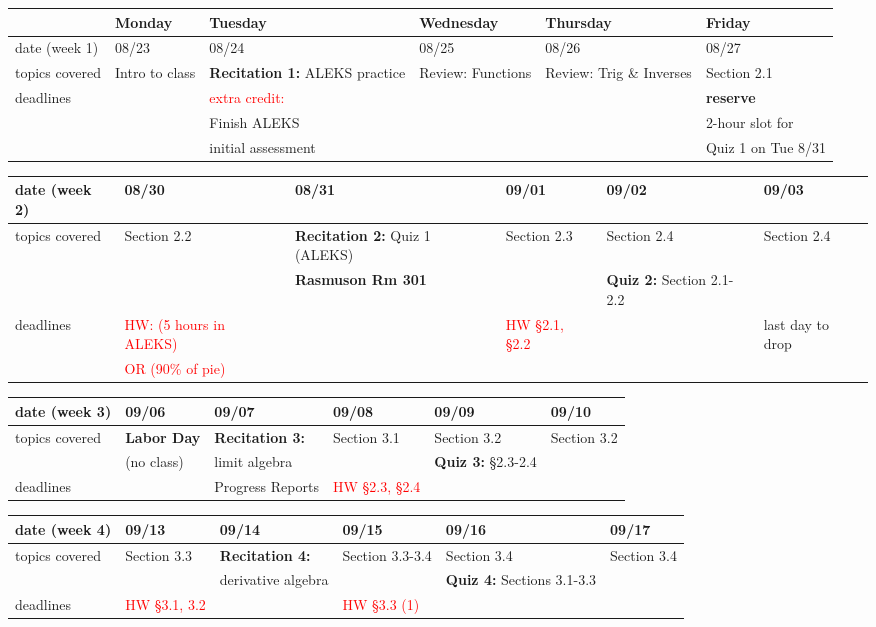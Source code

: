 \documentclass[11pt,fleqn]{article}
\begin{document}
\begin{tabularx}{\textwidth}{|X|| X | X | X | X | X |}
\hline
&Monday & Tuesday & Wednesday & Thursday & Friday \\
\hline \hline
\rowcolor{gray!20} 
date (week 1)&08/23&08/24&08/25&08/26&08/27\\
\hline
topics covered&Intro to class& \textbf{Recitation 1:} ALEKS practice&  Review: Functions & Review:  Trig \& Inverses&Section 2.1\\
\hline
deadlines&&\textcolor{red}{extra credit:} &&&\textbf{reserve}\\
&&Finish ALEKS&&&2-hour slot for\\
&& initial assessment &&& Quiz 1 on Tue 8/31\\
\hline 
\end{tabularx}
\vfill
\begin{tabularx}{\textwidth}{|X|| X | X | X | X | X |}
\hline
\rowcolor{gray!20}
date (week 2)&08/30&08/31&09/01&09/02&09/03\\ \hline
topics covered &Section 2.2&\textbf{Recitation 2:} Quiz 1 (ALEKS)& Section 2.3 &Section 2.4&Section 2.4\\ 
&&\textbf{\textcolor{ddgreen}{Rasmuson Rm 301}}&&\textbf{Quiz 2:} Section 2.1-2.2&\\ \hline
deadlines&\textcolor{red}{HW: (5 hours in ALEKS)}&&\textcolor{red}{HW \S 2.1, \S 2.2}&&\textcolor{ddgreen}{last day to drop}\\ 
& \textcolor{red}{ OR (90\% of pie)}&&&& \\
 \hline 
 \end{tabularx}
 \vfill
\begin{tabularx}{\textwidth}{|X|| X | X | X | X | X |}
\hline
\rowcolor{gray!20}
date (week 3)&09/06&09/07&09/08&09/09&09/10\\ \hline
topics covered&\textbf{Labor Day}&\textbf{Recitation 3:} &Section 3.1 &Section 3.2&Section 3.2\\
&(no class)&limit algebra&&\textbf{Quiz 3:} \S 2.3-2.4&\\ \hline
deadlines& & \textcolor{ddgreen}{Progress Reports}&\textcolor{red}{HW \S 2.3, \S 2.4}&& \\ \hline
\end{tabularx}
\vfill
\begin{tabularx}{\textwidth}{|X|| X | X | X | X | X |}
\hline
\rowcolor{gray!20}
date (week 4)&09/13&09/14&09/15&09/16&09/17\\ \hline
topics covered&Section 3.3&\textbf{Recitation 4:}&Section 3.3-3.4&Section 3.4&Section 3.4\\ 
&&derivative algebra&&\textbf{Quiz 4:} Sections 3.1-3.3& \\ \hline
deadlines&\textcolor{red}{HW \S 3.1, 3.2}& &\textcolor{red}{HW \S 3.3 (1)}&& \\ \hline 
\end{tabularx}
\end{document}
